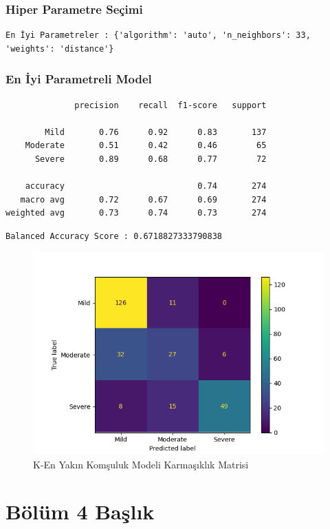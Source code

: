 \documentclass[12pt,twoside]{deuthesis}
\begin{document}
\hypertarget{hiper-parametre-seuxe7imi}{%
\subsection{Hiper Parametre Seçimi}\label{hiper-parametre-seuxe7imi}}
\begin{verbatim}
En İyi Parametreler : {'algorithm': 'auto', 'n_neighbors': 33, 'weights': 'distance'}
\end{verbatim}
\hypertarget{en-iyi-parametreli-model}{%
\subsection{En İyi Parametreli Model}\label{en-iyi-parametreli-model}}
\begin{verbatim}
              precision    recall  f1-score   support

        Mild       0.76      0.92      0.83       137
    Moderate       0.51      0.42      0.46        65
      Severe       0.89      0.68      0.77        72

    accuracy                           0.74       274
   macro avg       0.72      0.67      0.69       274
weighted avg       0.73      0.74      0.73       274
\end{verbatim}
\begin{verbatim}
Balanced Accuracy Score : 0.6718827333790838
\end{verbatim}
\begin{figure}

{\centering \includegraphics[width=1.05\linewidth,height=0.6\textheight]{figure/knn_conf} 

}

\caption{K-En Yakın Komşuluk Modeli Karmaşıklık Matrisi}\label{fig:unnamed-chunk-15}
\end{figure}
\hypertarget{Bolum4}{%
\chapter{Bölüm 4 Başlık}\label{Bolum4}}
\end{document}
